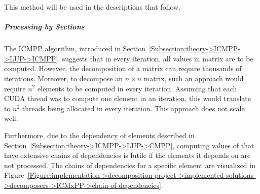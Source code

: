 This method will be used in the descriptions that follow.

\subparagraph{Processing by Sections} The ICMPP algorithm, introduced in Section~\ref{Subsection:theory->ICMPP->LUP->ICMPP}, suggests that in every iteration, all values in matrix  are to be computed. However, the decomposition of a matrix can require thousands of iterations. Moreover, to decompose an $n\times n$ matrix, such an approach would require $n^2$ elements to be computed in every iteration. Assuming that each CUDA thread was to compute one element in an iteration, this would translate to $n^2$ threads being allocated in every iteration. This approach does not scale well.

Furthermore, due to the dependency of elements described in Section~\ref{Subsection:theory->ICMPP->LUP->CMPP}, computing values of  that have extensive chains of dependencies is futile if the elements it depends on are not processed. The chains of dependencies for a specific element are visualized in Figure~\ref{Figure:implementation->decomposition-project->implemented-solutions->decomposers->ICMxPP->chain-of-dependencies}.

